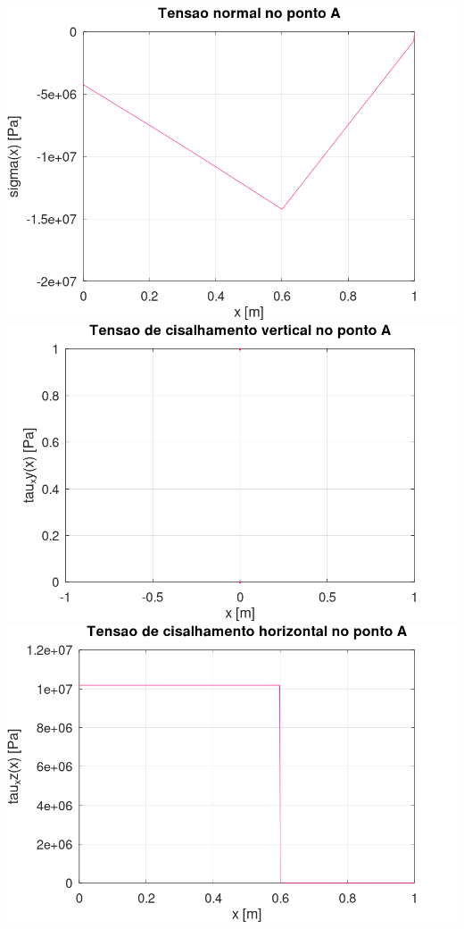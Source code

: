 \documentclass[10pt]{article}
\begin{document}
\begin{center}
    \includegraphics[scale=0.25]{figure9.png}
    \includegraphics[scale=0.25]{figure10.png}
    \includegraphics[scale=0.25]{figure11.png}

\end{center}
\end{document}
